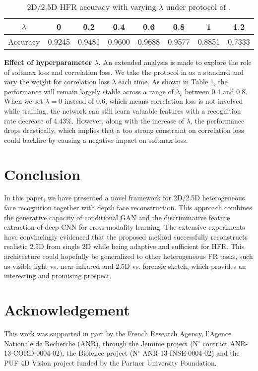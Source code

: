 \documentclass{bmvc2k}
\begin{document}
\begin{table}
\begin{center}
\begin{tabular}{cccccccc}
\hline
$\lambda$ & 0 & 0.2 & 0.4 & 0.6 & 0.8 & 1 & 1.2 \\
\hline
Accuracy & 0.9245 & 0.9481 & 0.9600 & 0.9688 & 0.9577 & 0.8851 & 0.7333\\
\hline
\end{tabular}
\end{center}
\caption{2D/2.5D HFR accuracy with varying $\lambda$ under protocol of \cite{huang2012oriented}.}
\label{hyper}
\end{table}

\textbf{Effect of hyperparameter $\lambda$.} An extended analysis is made to explore the role of softmax loss and correlation loss. We take the protocol in \cite{huang2012oriented} as a standard and vary the weight for correlation loss $\lambda$ each time. As shown in Table \ref{hyper}, the performance will remain largely stable across a range of $\lambda_c$ between 0.4 and 0.8. When we set $\lambda=0$ instead of 0.6, which means correlation loss is not involved while training, the network can still learn valuable features with a recognition rate decrease of 4.43$\%$. However, along with the increase of $\lambda$, the performance drops drastically, which implies that a too strong constraint on correlation loss could backfire by causing a negative impact on softmax loss.


\section{Conclusion}
In this paper, we have presented a novel framework for 2D/2.5D heterogeneous face recognition together with depth face reconstruction. This approach combines the generative capacity of conditional GAN and the discriminative feature extraction of deep CNN for cross-modality learning. The extensive experiments have convincingly evidenced that the proposed method successfully reconstructs realistic 2.5D from single 2D while being adaptive and sufficient for HFR. This architecture could hopefully be generalized to other heterogeneous FR tasks, such as visible light vs. near-infrared and 2.5D vs. forensic sketch, which provides an interesting and promising prospect.

\section{Acknowledgement}
This work was supported in part by the French Research Agency, l'Agence Nationale de Recherche (ANR), through the Jemime project (N$^\circ$ contract ANR-13-CORD-0004-02), the Biofence project (N$^\circ$ ANR-13-INSE-0004-02) and the PUF 4D Vision project funded by the Partner University Foundation.



\end{document}
